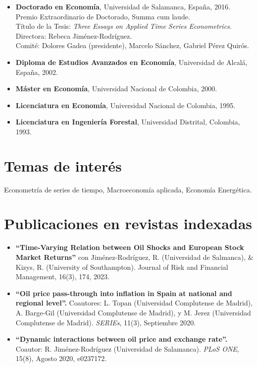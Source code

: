 \documentclass[11pt]{article}\usepackage[]{graphicx}\usepackage[usenames,dvipsnames]{xcolor}
\begin{document}
{\begin{itemize}
  \item {\textbf{Doctorado en Economía}, Universidad de Salamanca, España, 2016.\\
  Premio Extraordinario de Doctorado, Summa cum laude.\\
  Título de la Tesis: \emph{Three Essays on Applied Time Series Econometrics}.\\
  Directora: Rebeca Jiménez-Rodríguez.\\
  Comité: Dolores Gadea (presidente), Marcelo Sánchez, Gabriel Pérez Quirós}.
  \item \textbf{Diploma de Estudios Avanzados en Economía}, Universidad de Alcalá, España, 2002.
  \item \textbf{Máster en Economía}, Universidad Nacional de Colombia, 2000.
  \item \textbf{Licenciatura en Economía}, Universidad Nacional de Colombia, 1995.
  \item \textbf{Licenciatura en Ingeniería Forestal}, Universidad Distrital, Colombia, 1993.
\end{itemize}

\section{Temas de interés}

Econometría de series de tiempo, Macroeconomía aplicada, Economía Energética.

\section{Publicaciones en revistas indexadas}

\begin{itemize}
  \item \textbf{``Time-Varying Relation between Oil Shocks and European Stock Market Returns''} con Jiménez-Rodríguez, R. (Universidad de Salmanca), & Kizys, R. (University of Southampton). Journal of Risk and Financial Management, 16(3), 174, 2023.
  \item \textbf{``Oil price pass-through into inflation in Spain at national and regional level''.} Coautores: L. Topan (Universidad Complutense de Madrid), A. Barge-Gil (Universidad Complutense de Madrid), y M. Jerez (Universidad Complutense de Madrid). \emph{SERIEs}, 11(3), Septiembre 2020.
  
  \item \textbf{``Dynamic interactions between oil price and exchange rate''.} Coautor: R. Jiménez-Rodríguez (Universidad de Salamanca). \emph{PLoS ONE}, 15(8), Agosto 2020,  e0237172.
  

\end{itemize}}
\end{document}
